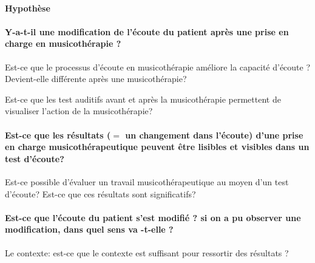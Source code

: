    
 

  

  
  


   
   
   
   







\paragraph{Hypothèse}



\paragraph{Y-a-t-il une modification de l'écoute du patient après une prise
en charge en musicothérapie ?}
Est-ce que le processus d'écoute en musicothérapie améliore la capacité
d'écoute ? Devient-elle différente après une musicothérapie?

Est-ce que les test auditifs avant et après la musicothérapie permettent
de visualiser l'action de la musicothérapie?


\paragraph{Est-ce que les résultats ($=$ un changement dans l'écoute) d'une prise
en charge musicothérapeutique peuvent être lisibles et visibles dans
un test d'écoute?}
Est-ce possible d'évaluer un travail musicothérapeutique au moyen
d'un test d'écoute?
Est-ce que ces résultats sont significatifs? 

\paragraph{Est-ce que l'écoute du patient s'est modifié ? si on a pu observer
une modification, dans quel sens va -t-elle ?}

Le contexte: 
est-ce que le contexte est suffisant pour
ressortir des résultats ?





